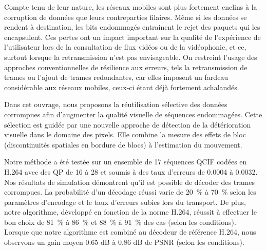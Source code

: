 \documentclass [memoire, letterpaper, oneside, 12pt]{thETS-utf8}
\begin{document}
\begin{sommaire}
Compte tenu de leur nature, les réseaux mobiles sont plus fortement enclins à la
corruption de données que leurs contreparties filaires. Même si les données se
rendent à destination, les bits endommagés entrainent le rejet des paquets qui
les encapsulent. Ces pertes ont un impact important sur la qualité de
l'expérience de l'utilisateur lors de la consultation de flux vidéos ou de la
vidéophonie, et ce, surtout lorsque la retransmission n'est pas envisageable. On
restreint l'usage des approches conventionnelles de résilience aux erreurs, tels
la retransmission de trames ou l'ajout de trames redondantes, car elles imposent
un fardeau considérable aux réseaux mobiles, ceux-ci étant déjà fortement
achalandés.

Dans cet ouvrage, nous proposons la réutilisation sélective des données
corrompues afin d'augmenter la qualité visuelle de séquences endommagées. Cette
sélection est guidée par une nouvelle approche de détection de la détérioration
visuelle dans le domaine des pixels. Elle combine la mesure des effets de bloc
(discontinuités spatiales en bordure de blocs) à l'estimation du mouvement.

Notre méthode a été testée sur un ensemble de 17 séquences QCIF codées en H.264
avec des QP de 16 à 28 et soumis à des taux d'erreurs de 0.0004 à 0.0032. Nos
résultats de simulation démontrent qu'il est possible de décoder des trames
corrompues. La probabilité d’un décodage réussi varie de 20~\% à 70~\% selon les
paramètres d’encodage et le taux d’erreurs subies lors du transport. De plus,
notre algorithme, développé en fonction de la norme H.264, réussit à effectuer
le bon choix de 81~\% à 86~\% et 88~\% à 91~\% des cas (selon les conditions).
Lorsque que notre algorithme est combiné au décodeur de référence H.264, nous
observons un gain moyen 0.65 dB à 0.86 dB de PSNR (selon les conditions).
\end{sommaire} 
\end{document}
